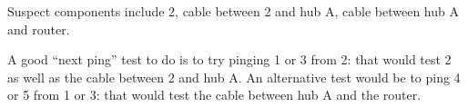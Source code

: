 Suspect components include 2, cable between 2 and hub A, cable between hub A and router.

\vskip 10pt

A good ``next ping'' test to do is to try pinging 1 or 3 from 2: that would test 2 as well as the cable between 2 and hub A.  An alternative test would be to ping 4 or 5 from 1 or 3: that would test the cable between hub A and the router.











